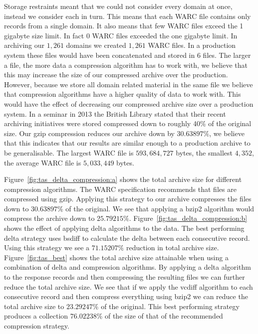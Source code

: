 \documentclass[11pt, twocolumn]{article}
\def \gzipcompressionpct {30.63897}
\def \bzipcompressionpct {25.79215}
\def \beststrategypct {23.29247}
\def \bestdeltapct {71.15207}
\def \bestvsgzippct {76.02238}
\def \domainscrawled {1,261}
\def \largewarccount {0}
\def \meanwarcsize {5,033,449}
\def \maxwarcsize {593,684,727}
\def \minwarcsize {4,352}
\def \warcfilecount {1,261}
\def \productionwarcfilecount {6}
\begin{document}
    Storage restraints meant that we could not consider every domain at once, instead we consider each in turn. This means that each WARC file contains only records from a single domain. It also means that few WARC files exceed the 1 gigabyte size limit. In fact $\largewarccount$ WARC files exceeded the one gigabyte limit. In archiving our $\domainscrawled$ domains we created $\warcfilecount$ WARC files. In a production system these files would have been concatenated and stored in $\productionwarcfilecount$ files. The larger a file, the more data a compression algorithm has to work with, we believe that this may increase the size of our compressed archive over the production. However, because we store all domain related material in the same file we believe that compression algorithms have a higher quality of data to work with. This would have the effect of decreasing our compressed archive size over a production system. In a seminar in 2013 the British Library stated that their recent archiving initiatives were stored compressed down to roughly 40\% of the original size. Our gzip compression reduces our archive down by $\gzipcompressionpct\%$, we believe that this indicates that our results are similar enough to a production archive to be generalisable. The largest WARC file is $\maxwarcsize$ bytes, the smallest $\minwarcsize$, the average WARC file is $\meanwarcsize$ bytes.

    Figure~\ref{fig:tas_delta_compression:a} shows the total archive size for different compression algorithms. The WARC specification recommends that files are compressed using gzip. Applying this strategy to our archive compresses the files down to $\gzipcompressionpct\%$ of the original. We see that applying a bzip2 algorithm would compress the archive down to $\bzipcompressionpct\%$. Figure~\ref{fig:tas_delta_compression:b} shows the effect of applying delta algorithms to the data. The best performing delta strategy uses bsdiff to calculate the delta between each consecutive record. Using this strategy we see a $\bestdeltapct\%$ reduction in total archive size. Figure~\ref{fig:tas_best} shows the total archive size attainable when using a combination of delta and compression algorithms. By applying a delta algorithm to the response records and then compressing the resulting files we can further reduce the total archive size. We see that if we apply the vcdiff algorithm to each consecutive record and then compress everything using bzip2 we can reduce the total archive size to $\beststrategypct\%$ of the original. This best performing strategy produces a collection $\bestvsgzippct\%$ of the size of that of the recommended compression strategy.
\end{document}
